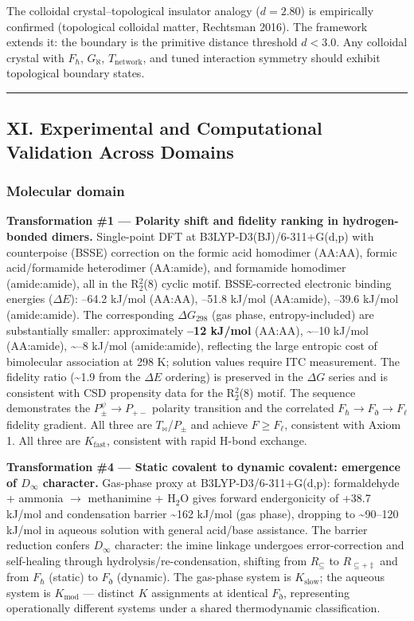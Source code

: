 \documentclass[12pt,a4paper]{article}
\begin{document}
The colloidal crystal--topological insulator analogy ($d = 2.80$) is empirically confirmed (topological colloidal matter, Rechtsman 2016). The framework extends it: the boundary is the primitive distance threshold $d < 3.0$. Any colloidal crystal with $F_\hbar$, $G_\aleph$, $T_\text{network}$, and tuned interaction symmetry should exhibit topological boundary states.

\begin{center}
\rule{0.5\textwidth}{0.4pt}
\end{center}

\subsection{XI. Experimental and Computational Validation Across Domains}

\subsubsection{Molecular domain}

\textbf{Transformation \#1 --- Polarity shift and fidelity ranking in hydrogen-bonded dimers.} Single-point DFT at B3LYP-D3(BJ)/6-311+G(d,p) with counterpoise (BSSE) correction on the formic acid homodimer (AA:AA), formic acid/formamide heterodimer (AA:amide), and formamide homodimer (amide:amide), all in the R$_2^2$(8) cyclic motif. BSSE-corrected electronic binding energies ($\Delta E$): --64.2 kJ/mol (AA:AA), --51.8 kJ/mol (AA:amide), --39.6 kJ/mol (amide:amide). The corresponding $\Delta G_{298}$ (gas phase, entropy-included) are substantially smaller: approximately \textbf{--12 kJ/mol} (AA:AA), \textasciitilde{}--10 kJ/mol (AA:amide), \textasciitilde{}--8 kJ/mol (amide:amide), reflecting the large entropic cost of bimolecular association at 298 K; solution values require ITC measurement. The fidelity ratio (\textasciitilde{}1.9 from the $\Delta E$ ordering) is preserved in the $\Delta G$ series and is consistent with CSD propensity data for the R$_2^2$(8) motif. The sequence demonstrates the $P_{\pm}^{\psi} \to P_{+-}$ polarity transition and the correlated $F_{\hbar} \to F_{\eth} \to F_{\ell}$ fidelity gradient. All three are $T_{\bowtie}$/$P_{\pm}$ and achieve $F \geq F_{\ell}$, consistent with Axiom 1. All three are $K_{\text{fast}}$, consistent with rapid H-bond exchange.

\textbf{Transformation \#4 --- Static covalent to dynamic covalent: emergence of $D_{\infty}$ character.} Gas-phase proxy at B3LYP-D3/6-311+G(d,p): formaldehyde + ammonia $\to$ methanimine + H$_2$O gives forward endergonicity of +38.7 kJ/mol and condensation barrier \textasciitilde{}162 kJ/mol (gas phase), dropping to \textasciitilde{}90--120 kJ/mol in aqueous solution with general acid/base assistance. The barrier reduction confers $D_{\infty}$ character: the imine linkage undergoes error-correction and self-healing through hydrolysis/re-condensation, shifting from $R_{\subseteq}$ to $R_{\subseteq + \ddagger}$ and from $F_{\hbar}$ (static) to $F_{\eth}$ (dynamic). The gas-phase system is $K_{\text{slow}}$; the aqueous system is $K_{\text{mod}}$ --- distinct $K$ assignments at identical $F_{\eth}$, representing operationally different systems under a shared thermodynamic classification.
\end{document}
